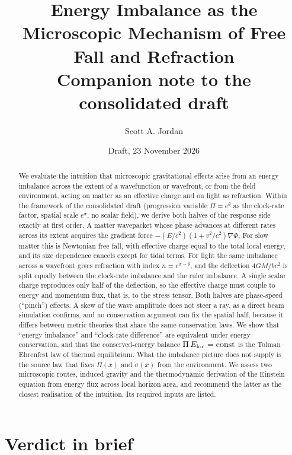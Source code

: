 \documentclass[11pt]{article}
\title{Energy Imbalance as the Microscopic Mechanism of Free Fall and Refraction\\[4pt]
\large Companion note to the consolidated draft}
\author{Scott A. Jordan}
\date{Draft, 23 November 2026}
\newcommand{\Pg}{\Pi}
\newcommand{\thP}{\theta}
\newcommand{\sgP}{\sigma}
\theoremstyle{plain}
\theoremstyle{remark}
\begin{document}
\maketitle

\begin{abstract}
We evaluate the intuition that microscopic gravitational effects arise from an energy imbalance across the extent of a wavefunction or wavefront, or from the field environment, acting on matter as an effective charge and on light as refraction. Within the framework of the consolidated draft (progression variable $\Pg=e^{\thP}$ as the clock-rate factor, spatial scale $e^{\sgP}$, no scalar field), we derive both halves of the response side exactly at first order. A matter wavepacket whose phase advances at different rates across its extent acquires the gradient force $-(E/c^2)(1+v^2/c^2)\nabla\Phi$. For slow matter this is Newtonian free fall, with effective charge equal to the total local energy, and its size dependence cancels except for tidal terms. For light the same imbalance across a wavefront gives refraction with index $n=e^{\sgP-\thP}$, and the deflection $4GM/bc^2$ is split equally between the clock-rate imbalance and the ruler imbalance. A single scalar charge reproduces only half of the deflection, so the effective charge must couple to energy and momentum flux, that is, to the stress tensor. Both halves are phase-speed (``pinch'') effects. A skew of the wave amplitude does not steer a ray, as a direct beam simulation confirms, and no conservation argument can fix the spatial half, because it differs between metric theories that share the same conservation laws. We show that ``energy imbalance'' and ``clock-rate difference'' are equivalent under energy conservation, and that the conserved-energy balance $\Pg\,E_{\rm loc}=\text{const}$ is the Tolman--Ehrenfest law of thermal equilibrium. What the imbalance picture does not supply is the source law that fixes $\Pg(x)$ and $\sgP(x)$ from the environment. We assess two microscopic routes, induced gravity and the thermodynamic derivation of the Einstein equation from energy flux across local horizon area, and recommend the latter as the closest realisation of the intuition. Its required inputs are listed.
\end{abstract}

\tableofcontents

\section{Verdict in brief}
\end{document}

